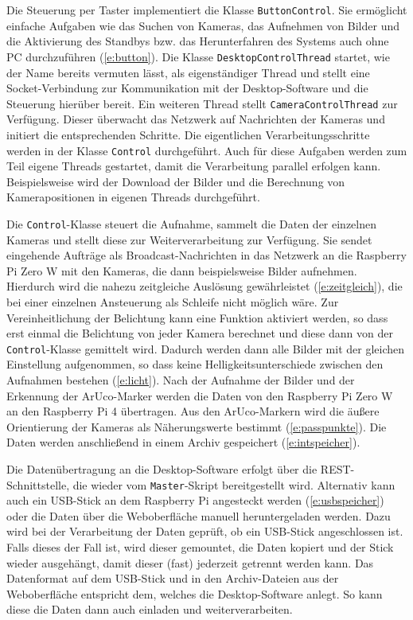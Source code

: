 \documentclass[./00PhotoBox.tex]{subfiles}
\begin{document}
Die Steuerung per Taster implementiert die Klasse \texttt{ButtonControl}. Sie ermöglicht einfache Aufgaben wie das Suchen von Kameras, das Aufnehmen von Bilder und die Aktivierung des Standbys bzw. das Herunterfahren des Systems auch ohne PC durchzuführen (\autoref{e:button}). Die Klasse \texttt{DesktopControlThread} startet, wie der Name bereits vermuten lässt, als eigenständiger Thread und stellt eine Socket-Verbindung zur Kommunikation mit der Desktop-Software und die Steuerung hierüber bereit. Ein weiteren Thread stellt \texttt{CameraControlThread} zur Verfügung. Dieser überwacht das Netzwerk auf Nachrichten der Kameras und initiert die entsprechenden Schritte. Die eigentlichen Verarbeitungsschritte werden in der Klasse \texttt{Control} durchgeführt. Auch für diese Aufgaben werden zum Teil eigene Threads gestartet, damit die Verarbeitung parallel erfolgen kann. Beispielsweise wird der Download der Bilder und die Berechnung von Kamerapositionen in eigenen Threads durchgeführt.

Die \texttt{Control}-Klasse steuert die Aufnahme, sammelt die Daten der einzelnen Kameras und stellt diese zur Weiterverarbeitung zur Verfügung. Sie sendet eingehende Aufträge als Broadcast-Nachrichten in das Netzwerk an die Raspberry Pi Zero W mit den Kameras, die dann beispielsweise Bilder aufnehmen. Hierdurch wird die nahezu zeitgleiche Auslösung gewährleistet (\autoref{e:zeitgleich}), die bei einer einzelnen Ansteuerung als Schleife nicht möglich wäre. Zur Vereinheitlichung der Belichtung kann eine Funktion aktiviert werden, so dass erst einmal die Belichtung von jeder Kamera berechnet und diese dann von der \texttt{Control}-Klasse gemittelt wird. Dadurch werden dann alle Bilder mit der gleichen Einstellung aufgenommen, so dass keine Helligkeitsunterschiede zwischen den Aufnahmen bestehen (\autoref{e:licht}).
Nach der Aufnahme der Bilder und der Erkennung der ArUco-Marker werden die Daten von den Raspberry Pi Zero W an den Raspberry Pi 4 übertragen. Aus den ArUco-Markern wird die äußere Orientierung der Kameras als Näherungswerte bestimmt (\autoref{e:passpunkte}). Die Daten werden anschließend in einem Archiv gespeichert (\autoref{e:intspeicher}).

Die Datenübertragung an die Desktop-Software erfolgt über die REST-Schnittstelle, die wieder vom \texttt{Master}-Skript bereitgestellt wird. Alternativ kann auch ein USB-Stick an dem Raspberry Pi angesteckt werden (\autoref{e:usbspeicher}) oder die Daten über die Weboberfläche manuell heruntergeladen werden. Dazu wird bei der Verarbeitung der Daten geprüft, ob ein USB-Stick angeschlossen ist. Falls dieses der Fall ist, wird dieser gemountet, die Daten kopiert und der Stick wieder ausgehängt, damit dieser (fast) jederzeit getrennt werden kann. Das Datenformat auf dem USB-Stick und in den Archiv-Dateien aus der Weboberfläche entspricht dem, welches die Desktop-Software anlegt. So kann diese die Daten dann auch einladen und weiterverarbeiten.
\end{document}
